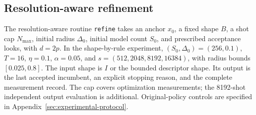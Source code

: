 \documentclass[11pt]{article}
\begin{document}
\subsection{Resolution-aware refinement}
The resolution-aware routine \texttt{refine} takes an anchor $x_0$, a fixed shape
$B$, a shot cap $N_{\max}$, initial radius $\Delta_0$, initial model count
$S_0$, and prescribed acceptance looks, with $d=2p$. In the shape-by-rule experiment,
$(S_0,\Delta_0)=(256,0.1)$, $T=16$, $\eta=0.1$, $\alpha=0.05$, and
$s=(512,2048,8192,16384)$, with radius bounds $[0.025,0.8]$.
The input shape is $I$ or the bounded descriptor shape. Its output is the
last accepted incumbent, an explicit stopping reason, and the complete measurement record.
The cap covers optimization measurements; the 8192-shot independent output
evaluation is additional. Original-policy controls are specified in
Appendix~\ref{sec:experimental-protocol}.
\end{document}
